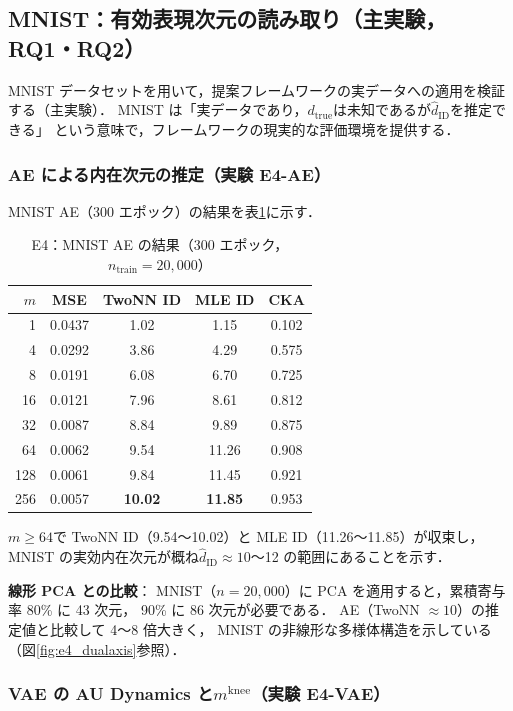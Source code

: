 \documentclass[11pt,a4paper]{jsarticle}
\newcommand{\dtrue}{d_{\mathrm{true}}}
\newcommand{\mknee}{m^{\mathrm{knee}}}
\begin{document}
\subsection{MNIST：有効表現次元の読み取り（主実験，RQ1・RQ2）}\label{sec:exp_mnist}

MNIST データセットを用いて，提案フレームワークの実データへの適用を検証する（主実験）．
MNIST は「実データであり，$\dtrue$は未知であるが$\hat{d}_\mathrm{ID}$を推定できる」
という意味で，フレームワークの現実的な評価環境を提供する．

\subsubsection{AE による内在次元の推定（実験 E4-AE）}

MNIST AE（300 エポック）の結果を表\ref{tab:e4_ae}に示す．

\begin{table}[H]
\centering
\caption{E4：MNIST AE の結果（300 エポック，$n_{\mathrm{train}}=20{,}000$）}
\label{tab:e4_ae}
\small
\begin{tabular}{rcccc}
\toprule
$m$ & MSE & TwoNN ID & MLE ID & CKA \\
\midrule
1   & 0.0437 & 1.02  & 1.15  & 0.102 \\
4   & 0.0292 & 3.86  & 4.29  & 0.575 \\
8   & 0.0191 & 6.08  & 6.70  & 0.725 \\
16  & 0.0121 & 7.96  & 8.61  & 0.812 \\
32  & 0.0087 & 8.84  & 9.89  & 0.875 \\
64  & 0.0062 & 9.54  & 11.26 & 0.908 \\
128 & 0.0061 & 9.84  & 11.45 & 0.921 \\
256 & 0.0057 & \textbf{10.02} & \textbf{11.85} & 0.953 \\
\bottomrule
\end{tabular}
\end{table}

$m \geq 64$で TwoNN ID（9.54〜10.02）と MLE ID（11.26〜11.85）が収束し，
MNIST の実効内在次元が概ね$\hat{d}_\mathrm{ID} \approx 10$〜12 の範囲にあることを示す．

\textbf{線形 PCA との比較}：
MNIST（$n = 20{,}000$）に PCA を適用すると，累積寄与率 80\% に 43 次元，
90\% に 86 次元が必要である．
AE（TwoNN $\approx 10$）の推定値と比較して 4〜8 倍大きく，
MNIST の非線形な多様体構造を示している（図\ref{fig:e4_dualaxis}参照）．

\subsubsection{VAE の AU Dynamics と$\mknee$（実験 E4-VAE）}
\end{document}
